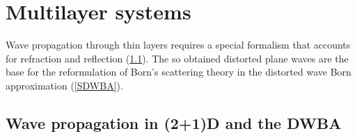 

\chapter{Multilayer systems}  \label{sec:Multilayers}


%

Wave propagation through thin layers requires
a special formalism that accounts for
refraction and reflection (\cref{Swave21}).
The so obtained distorted plane waves are the base
for the reformulation of Born's scattering theory
in the distorted wave Born approximation (\cref{SDWBA}).


\section{Wave propagation in (2+1)D and the DWBA}\label{Swave21}

